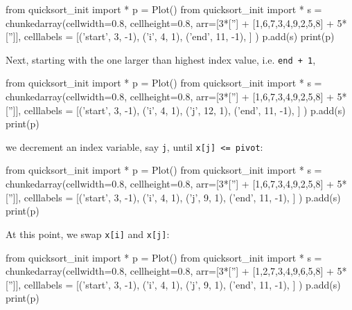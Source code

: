 \begin{python}
from quicksort_init import *
p = Plot()
from quicksort_init import *
s = chunkedarray(cellwidth=0.8, 
                   cellheight=0.8,
                   arr=[3*[''] + [1,6,7,3,4,9,2,5,8] + 5*['']],
                   celllabels = [('start', 3, -1),
                                 ('i', 4, 1),
                                 ('end',   11, -1),
                                ]
)
p.add(s)
print(p)
\end{python}

Next, starting with the one larger than highest index value, i.e.
\verb!end + 1!,

\begin{python}
from quicksort_init import *
p = Plot()
from quicksort_init import *
s = chunkedarray(cellwidth=0.8, 
                   cellheight=0.8,
                   arr=[3*[''] + [1,6,7,3,4,9,2,5,8] + 5*['']],
                   celllabels = [('start', 3, -1),
                                 ('i', 4, 1),
                                 ('j', 12, 1),
                                 ('end',   11, -1),
                                ]
)
p.add(s)
print(p)
\end{python}

we decrement an index variable, say \verb!j!,
until \verb!x[j] <= pivot!:

\begin{python}
from quicksort_init import *
p = Plot()
from quicksort_init import *
s = chunkedarray(cellwidth=0.8, 
                   cellheight=0.8,
                   arr=[3*[''] + [1,6,7,3,4,9,2,5,8] + 5*['']],
                   celllabels = [('start', 3, -1),
                                 ('i', 4, 1),
                                 ('j', 9, 1),
                                 ('end',   11, -1),
                                ]
)
p.add(s)
print(p)
\end{python}

At this point, we swap \verb!x[i]! and \verb!x[j]!:

\begin{python}
from quicksort_init import *
p = Plot()
from quicksort_init import *
s = chunkedarray(cellwidth=0.8, 
                   cellheight=0.8,
                   arr=[3*[''] + [1,2,7,3,4,9,6,5,8] + 5*['']],
                   celllabels = [('start', 3, -1),
                                 ('i', 4, 1),
                                 ('j', 9, 1),
                                 ('end',   11, -1),
                                ]
)
p.add(s)
print(p)
\end{python}

